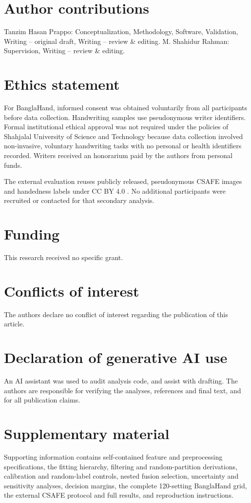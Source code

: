 \documentclass[ASNA,twocolumn]{USG}
\begin{document}
\section*{Author contributions}
Tanzim Hasan Prappo: Conceptualization, Methodology, Software, Validation, Writing -- original draft, Writing -- review \& editing. M. Shahidur Rahman: Supervision, Writing -- review \& editing.

\section*{Ethics statement}
For BanglaHand, informed consent was obtained voluntarily from all participants before data collection. Handwriting samples use pseudonymous writer identifiers. Formal institutional ethical approval was not required under the policies of Shahjalal University of Science and Technology because data collection involved non-invasive, voluntary handwriting tasks with no personal or health identifiers recorded. Writers received an honorarium paid by the authors from personal funds.

The external evaluation reuses publicly released, pseudonymous CSAFE images and handedness labels under CC BY 4.0 \cite{crawford2020database,crawford2026csafe}. No additional participants were recruited or contacted for that secondary analysis.

\section*{Funding}
This research received no specific grant.

\section*{Conflicts of interest}
The authors declare no conflict of interest regarding the publication of this article.

\section*{Declaration of generative AI use}
An AI assistant was used to audit analysis code, and assist with drafting. The authors are responsible for verifying the analyses, references and final text, and for all publication claims.

\section*{Supplementary material}
Supporting information contains self-contained feature and preprocessing specifications, the fitting hierarchy, filtering and random-partition derivations, calibration and random-label controls, nested fusion selection, uncertainty and sensitivity analyses, decision margins, the complete 120-setting BanglaHand grid, the external CSAFE protocol and full results, and reproduction instructions.

\let\IETOriginalBibitem\bibitem
\renewcommand{\bibitem}[2][]{\ifstrequal{#2}{crawford2020database}{\newpage}{}\IETOriginalBibitem[#1]{#2}}

\end{document}
